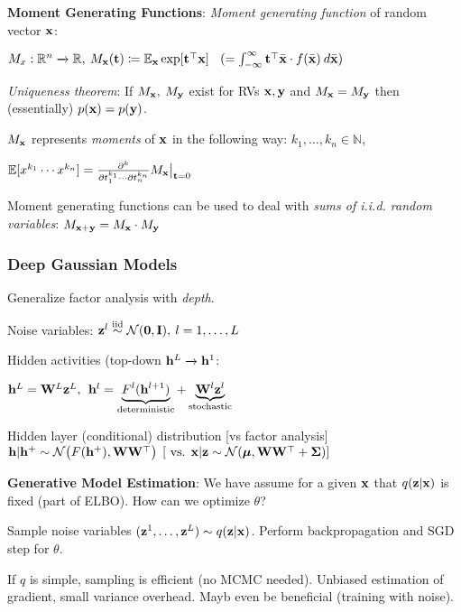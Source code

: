     \textbf{Moment Generating Functions}: \emph{Moment generating function} of random vector $\mathbf x$:
    
    \tab $M_x:\mathbb R^n\xrightarrow{}\mathbb R,\> M_\mathbf x(\mathbf t)\coloneqq\mathbb E_{\mathbf x}\exp \lbrack \mathbf t^{\mathop{\mathrm{\top}}} \mathbf x \rbrack \>\>\>\>(= \int^\infty_{-\infty}\mathbf t^{\mathop{\mathrm{\top}}} \bar{\mathbf x} \cdot f(\bar{\mathbf x}) \> d\bar{\mathbf x})$
    
    \emph{Uniqueness theorem}: If $M_\mathbf x,\>M_\mathbf y$ exist for RVs $\mathbf x,\mathbf y$ and $M_\mathbf x=M_\mathbf y$ then (essentially) $p(\mathbf x)=p(\mathbf y)$.
    
    $M_\mathbf x$ represents \emph{moments} of $\mathbf x$ in the following way: $k_1,\ldots,k_n\in\mathbb{N}$,
    
    \tab $\mathbb E \lbrack x^{k_1} \cdots x^{k_n} \rbrack=\frac{\partial^k}{\partial t^{k_1}_1\cdots \partial t^{k_n}_n}M_\mathbf x \bigr|_{\mathbf t=0}$
    
    Moment generating functions can be used to deal with \emph{sums of i.i.d. random variables}: $M_{\mathbf x+\mathbf y}=M_\mathbf x \cdot M_\mathbf y$
    
    
    \subsubsection{Deep Gaussian Models}
    \label{ssub:deepgaussianmodels}
    
    Generalize factor analysis with \emph{depth}. 
    
    Noise variables: $\mathbf z^l \overset{\text{iid}}{\sim} \mathcal{N}(\mathbf{0},\mathbf I),\>l=1,\ldots,L$
    
    Hidden activities (top-down $\mathbf h^L\xrightarrow{}\mathbf h^1$:
    
    \tab $\mathbf h^L=\mathbf W^L\mathbf z^L,\>\> \mathbf h^l=\underbrace{F^l(\mathbf h^{l+1})}_\text{deterministic}+\underbrace{\mathbf W^l\mathbf z^l}_\text{stochastic}$
    
    Hidden layer (conditional) distribution [vs factor analysis] \\
    \tab $\mathbf h|\mathbf h^+\sim\mathcal{N}\bigr(F(\mathbf h^+),\mathbf W\mathbf W^{\mathop{\mathrm{\top}}}  \bigr)\>\>\lbrack\text{ vs. } \mathbf x|\mathbf z\sim\mathcal{N}(\mbox{\boldmath $\mu$},\mathbf W\mathbf W^{\mathop{\mathrm{\top}}}+\mathbf \Sigma)  \rbrack$
    
    \textbf{Generative Model Estimation}: We have assume for a given $\mathbf x$ that $q(\mathbf z|\mathbf x)$ is fixed (part of ELBO). How can we optimize $\theta$?
    
    Sample noise variables $(\mathbf z^1,\ldots,\mathbf z^L)\sim q(\mathbf z|\mathbf x)$. Perform backpropagation and SGD step for $\theta$.
    
    \tab If $q$ is simple, sampling is efficient (no MCMC needed). Unbiased estimation of gradient, small variance overhead. Mayb even be beneficial (training with noise).
    
